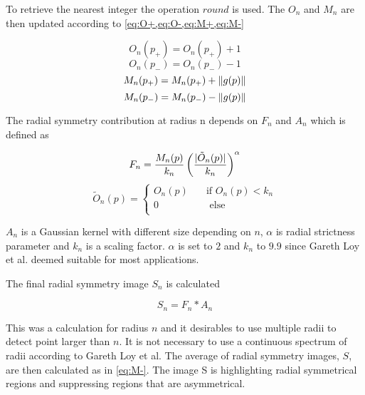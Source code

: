 To retrieve the nearest integer the operation $round$ is used. The $O_n$ and $M_n$ are then updated according to \cref{eq:O+,eq:O-,eq:M+,eq:M-}

\begin{equation} \label{eq:O+}
O_{n}(p_{+}) = O_{n}(p_{+}) + 1
\end{equation}
\begin{equation} \label{eq:O-}
O_{n}(p_{-}) = O_{n}(p_{-}) - 1
\end{equation}
\begin{equation} \label{eq:M+}
M_{n}(p_{+}) = M_{n}(p_{+}) + \lVert g(p)\rVert
\end{equation}
\begin{equation} \label{eq:M-}
M_{n}(p_{-}) = M_{n}(p_{-}) - \lVert g(p)\rVert
\end{equation}

The radial symmetry contribution at radius n depends on $F_n$ and $A_n$ which is defined as 

\begin{equation} \label{eq:F}
F_n = \frac{M_{n}(p)}{k_n} \left(\frac{\lvert\tilde{O}_n(p)\rvert}{k_n}\right)^{\alpha}
\end{equation}
\begin{equation} \label{eq:A}
\tilde{O}_n(p) =   
\begin{cases}
O_n(p)    & \quad \text{if } O_n(p) < k_n\\
0		& \quad  \text{ else}\\
\end{cases}
\end{equation}

$A_n$ is a Gaussian kernel with different size depending on $n$, $\alpha$ is radial strictness parameter and $k_n$ is a scaling factor. $\alpha$ is set to $2$ and $k_n$ to $9.9$ since Gareth Loy et al. deemed suitable for most applications.

The final radial symmetry image $S_n$ is calculated 

\begin{equation} \label{eq:M-}
S_{n} = F_n * A_n
\end{equation}

This was a calculation for radius $n$ and it desirables to use multiple radii to detect point larger than $n$. It is not necessary to use a continuous spectrum of radii according to Gareth Loy et al. The average of radial symmetry images, $S$, are then calculated as in \cref{eq:M-}. The image S is highlighting radial symmetrical regions and suppressing regions that are asymmetrical.  

